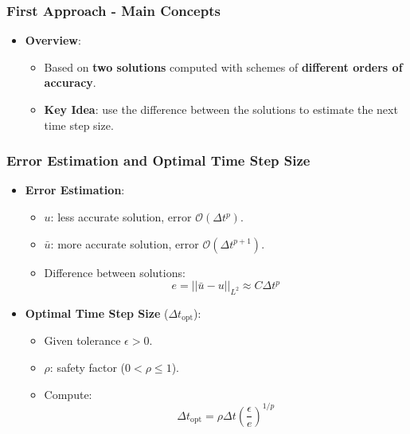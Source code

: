 \documentclass{settings/laserbeam}
\begin{document}
\begin{frame}
    
    \frametitle{First Approach - Main Concepts}

    \begin{cbox}
    \begin{itemize}
        \item \textbf{Overview}:
        \begin{itemize}
            \item Based on \textbf{two solutions} computed with schemes of \textbf{different orders of accuracy}.
            \item \textbf{Key Idea}: use the difference between the solutions to estimate the next time step size.
        \end{itemize}
    \end{itemize}
    \end{cbox}
\end{frame}

\begin{frame}
    
    \frametitle{Error Estimation and Optimal Time Step Size}

    \begin{cbox}
    \begin{itemize}
        \item \textbf{Error Estimation}:
        \begin{itemize}
            \item $u$: less accurate solution, error $\mathcal{O}(\Delta t^p)$.
            \item $\bar{u}$: more accurate solution, error $\mathcal{O}(\Delta t^{p+1})$.
            \item Difference between solutions:
            $$
            e = ||\bar{u}-u||_{L^2} \approx C \Delta t^p
            $$
        \end{itemize}
    \end{itemize}
    \end{cbox}
    \vspace{0.5cm}
    \begin{cbox}
    \begin{itemize}
        \item \textbf{Optimal Time Step Size} ($\Delta t_{\text{opt}}$):
        \begin{itemize}
            \item Given tolerance $\epsilon>0$.
            \item $\rho$: safety factor ($0<\rho\leq1$).
            \item Compute:
            $$
            \Delta t_{\text{opt}} = \rho \Delta t \left( \frac{\epsilon}{e} \right)^{1/p}
            $$
        \end{itemize}
    \end{itemize}
    \end{cbox}
\end{frame}
\end{document}
